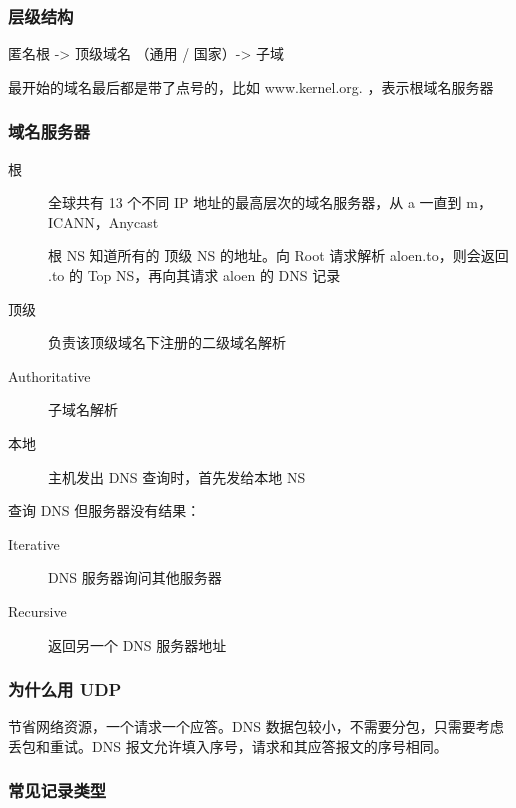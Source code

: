 \documentclass[11pt,journal,compsoc]{IEEEtran}
\begin{document}
\subsubsection{层级结构}

匿名根 -> 顶级域名 （通用 / 国家）-> 子域

最开始的域名最后都是带了点号的，比如 www.kernel.org. ，表示根域名服务器


\subsubsection{域名服务器}

\begin{description}
    \item[根] 全球共有 13 个不同 IP 地址的最高层次的域名服务器，从 a 一直到 m，ICANN，Anycast

    根 NS 知道所有的 顶级 NS 的地址。向 Root 请求解析 aloen.to，则会返回 .to 的 Top NS，再向其请求 aloen 的 DNS 记录

    \item[顶级] 负责该顶级域名下注册的二级域名解析

    \item[Authoritative] 子域名解析

    \item[本地] 主机发出 DNS 查询时，首先发给本地 NS
\end{description}

查询 DNS 但服务器没有结果：

\begin{description}
    \item[Iterative] DNS 服务器询问其他服务器
    \item[Recursive] 返回另一个 DNS 服务器地址
\end{description}


\subsubsection{为什么用 UDP}

节省网络资源，一个请求一个应答。DNS 数据包较小，不需要分包，只需要考虑丢包和重试。DNS 报文允许填入序号，请求和其应答报文的序号相同。


\subsubsection{常见记录类型}
\end{document}
